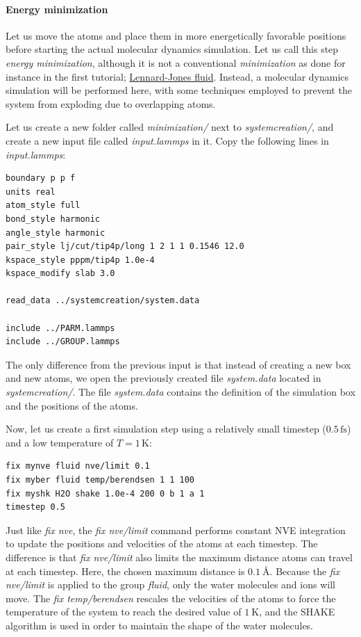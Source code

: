 \documentclass[9pt,tutorial]{livecoms}
\begin{document}
\paragraph{Energy minimization}
Let us move the atoms and place them in more energetically favorable positions before starting the actual molecular dynamics simulation. Let us call this step \textit{energy minimization}, although it is not a conventional \textit{minimization} as done for instance in the first tutorial; \hyperref[lennard-jones-label]{Lennard-Jones fluid}. Instead, a molecular dynamics simulation will be performed here, with some techniques employed to prevent the system from exploding due to overlapping atoms.

Let us create a new folder called \textit{minimization/} next to \textit{systemcreation/}, and create a new input file called \textit{input.lammps} in it. Copy the following lines in \textit{input.lammps}:
{\normalsize \begin{verbatim}
boundary p p f
units real
atom_style full
bond_style harmonic
angle_style harmonic
pair_style lj/cut/tip4p/long 1 2 1 1 0.1546 12.0
kspace_style pppm/tip4p 1.0e-4
kspace_modify slab 3.0

read_data ../systemcreation/system.data

include ../PARM.lammps
include ../GROUP.lammps
\end{verbatim}}
The only difference from the previous input is that instead of creating a new box and new atoms, we open the previously created file \textit{system.data} located in \textit{systemcreation/}. The file \textit{system.data} contains the definition of the simulation box and the positions of the atoms.

Now, let us create a first simulation step using a relatively small 
timestep ($0.5\,\text{fs}$) and a low temperature of $T = 1\,\text{K}$:
{\normalsize \begin{verbatim}
fix mynve fluid nve/limit 0.1
fix myber fluid temp/berendsen 1 1 100
fix myshk H2O shake 1.0e-4 200 0 b 1 a 1
timestep 0.5
\end{verbatim}}
Just like \textit{fix nve}, the \textit{fix nve/limit} command performs constant NVE integration to update the positions and velocities of the atoms at each timestep. The difference is that \textit{fix nve/limit} also limits the maximum distance atoms can travel at each timestep. Here, the chosen maximum distance is $0.1~\text{\AA{}}$. Because the \textit{fix nve/limit} is applied to the group \textit{fluid}, only the water molecules and ions will move. The \textit{fix temp/berendsen} rescales the velocities of the atoms to force the temperature of the system to reach the desired value of $1~\text{K}$, and the SHAKE algorithm is used in order to maintain the shape of the water molecules.
\end{document}

